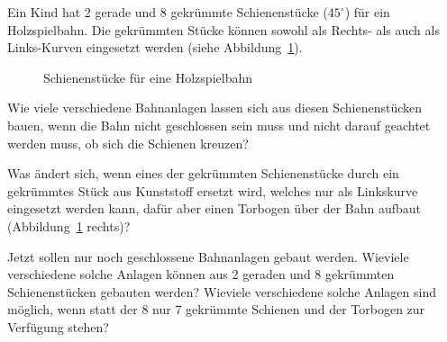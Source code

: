 Ein Kind hat 2 gerade und 8 gekrümmte Schienenstücke ($45^\circ$) für
ein Holzspielbahn.
Die gekrümmten Stücke können sowohl als Rechts- als auch als
Links-Kurven eingesetzt werden (siehe Abbildung~\ref{10000021:bild}).
\begin{figure}[h]
\centering
{}
\quad
{}
\caption{Schienenstücke für eine Holzspielbahn
\label{10000021:bild}}
\end{figure}

\begin{teilaufgaben}
\item
Wie viele verschiedene Bahnanlagen lassen sich aus diesen Schienenstücken
bauen, wenn die Bahn nicht geschlossen sein muss und nicht darauf geachtet
werden muss, ob sich die Schienen kreuzen?
\item
Was ändert sich, wenn eines der gekrümmten Schienenstücke durch ein
gekrümmtes Stück aus Kunststoff ersetzt wird, welches nur als Linkskurve
eingesetzt werden kann, dafür aber einen Torbogen über der Bahn aufbaut
(Abbildung~\ref{10000021:bild} rechts)?
\item
Jetzt sollen nur noch geschlossene Bahnanlagen gebaut werden.
Wieviele verschiedene solche Anlagen können aus 2 geraden und 8
gekrümmten Schienenstücken gebauten werden?
Wieviele verschiedene solche Anlagen sind möglich, wenn statt der
8 nur 7 gekrümmte Schienen und der Torbogen zur Verfügung stehen?
\end{teilaufgaben}

